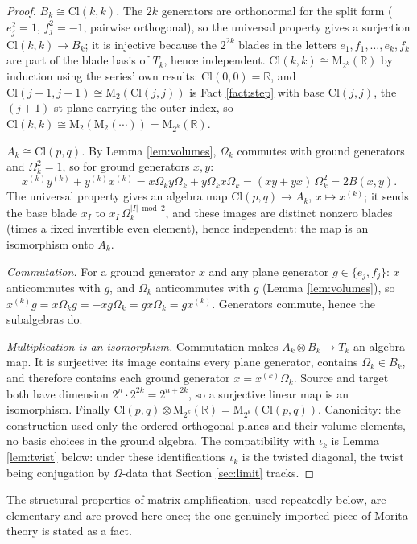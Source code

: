 \documentclass[11pt]{article}
\theoremstyle{definition}
\newcommand{\Cl}{\mathrm{Cl}}
\newcommand{\R}{\mathbb{R}}
\newcommand{\Mat}{\mathrm{M}}
\begin{document}
\begin{proof}
\emph{$B_k \cong \Cl(k,k)$.} The $2k$ generators are orthonormal for the split form ($e_j^2 = 1$, $f_j^2 = -1$, pairwise orthogonal), so the universal property gives a surjection $\Cl(k,k) \to B_k$; it is injective because the $2^{2k}$ blades in the letters $e_1, f_1, \dots, e_k, f_k$ are part of the blade basis of $T_k$, hence independent. \emph{$\Cl(k,k) \cong \Mat_{2^k}(\R)$} by induction using the series' own results: $\Cl(0,0) = \R$, and $\Cl(j{+}1,j{+}1) \cong \Mat_2(\Cl(j,j))$ is Fact \ref{fact:step} with base $\Cl(j,j)$, the $(j{+}1)$-st plane carrying the outer index, so $\Cl(k,k) \cong \Mat_2(\Mat_2(\cdots)) = \Mat_{2^k}(\R)$.

\emph{$A_k \cong \Cl(p,q)$.} By Lemma \ref{lem:volumes}, $\Omega_k$ commutes with ground generators and $\Omega_k^2 = 1$, so for ground generators $x, y$:
\[
x^{(k)} y^{(k)} + y^{(k)} x^{(k)} = x \Omega_k y \Omega_k + y \Omega_k x \Omega_k = (xy + yx)\,\Omega_k^2 = 2B(x,y) .
\]
The universal property gives an algebra map $\Cl(p,q) \to A_k$, $x \mapsto x^{(k)}$; it sends the base blade $x_I$ to $x_I\,\Omega_k^{|I| \bmod 2}$, and these images are distinct nonzero blades (times a fixed invertible even element), hence independent: the map is an isomorphism onto $A_k$.

\emph{Commutation.} For a ground generator $x$ and any plane generator $g \in \{e_j, f_j\}$: $x$ anticommutes with $g$, and $\Omega_k$ anticommutes with $g$ (Lemma \ref{lem:volumes}), so $x^{(k)} g = x \Omega_k g = -x g \Omega_k = g x \Omega_k = g x^{(k)}$. Generators commute, hence the subalgebras do.

\emph{Multiplication is an isomorphism.} Commutation makes $A_k \otimes B_k \to T_k$ an algebra map. It is surjective: its image contains every plane generator, contains $\Omega_k \in B_k$, and therefore contains each ground generator $x = x^{(k)} \Omega_k$. Source and target both have dimension $2^n \cdot 2^{2k} = 2^{n + 2k}$, so a surjective linear map is an isomorphism. Finally $\Cl(p,q) \otimes \Mat_{2^k}(\R) = \Mat_{2^k}(\Cl(p,q))$. Canonicity: the construction used only the ordered orthogonal planes and their volume elements, no basis choices in the ground algebra. The compatibility with $\iota_k$ is Lemma \ref{lem:twist} below: under these identifications $\iota_k$ is the twisted diagonal, the twist being conjugation by $\Omega$-data that Section \ref{sec:limit} tracks.
\end{proof}

The structural properties of matrix amplification, used repeatedly below, are elementary and are proved here once; the one genuinely imported piece of Morita theory is stated as a fact.
\end{document}
